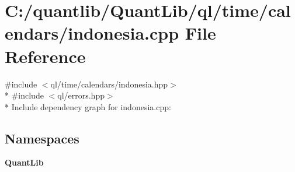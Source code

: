 \section{C\+:/quantlib/\+Quant\+Lib/ql/time/calendars/indonesia.cpp File Reference}
\label{indonesia_8cpp}
{\ttfamily \#include $<$ql/time/calendars/indonesia.\+hpp$>$}\\*
{\ttfamily \#include $<$ql/errors.\+hpp$>$}\\*
Include dependency graph for indonesia.\+cpp\+:
\subsection*{Namespaces}
\begin{DoxyCompactItemize}
\item 
 {\bf Quant\+Lib}
\end{DoxyCompactItemize}
